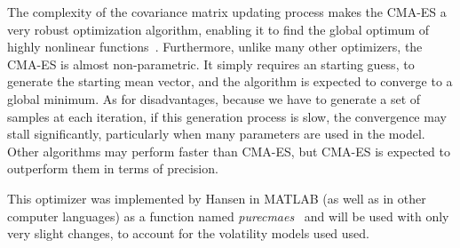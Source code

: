 The complexity of the covariance matrix updating process makes the CMA-ES a very robust optimization algorithm, enabling it to find the global optimum of highly nonlinear functions~\citep{DilaoCMA}.
Furthermore, unlike many other optimizers, the CMA-ES is almost non-parametric. It simply requires an starting guess, to generate the starting mean vector, and the algorithm is expected to converge to a global minimum.
As for disadvantages, because we have to generate a set of samples at each iteration, if this generation process is slow, the convergence may stall significantly, particularly when many parameters are used in the model. Other algorithms may perform faster than CMA-ES, but CMA-ES is expected to outperform them in terms of precision.

This optimizer was implemented by Hansen in MATLAB (as well as in other computer languages) as a function named \emph{purecmaes}~\citep{CMAES} and will be used with only very slight changes, to account for the volatility models used used.

